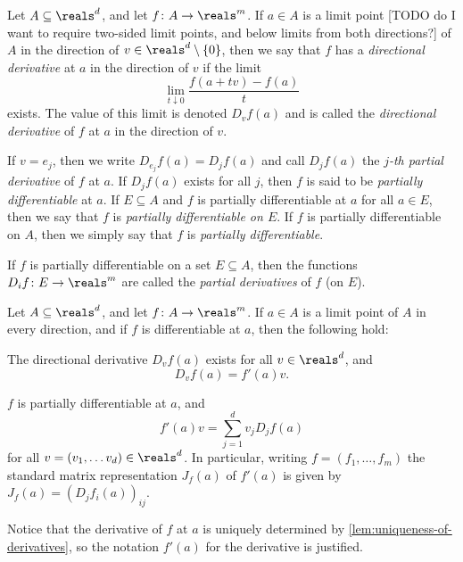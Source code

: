 \documentclass[article, a4paper, 11pt, oneside]{memoir}
\numberwithin{equation}{chapter}
\begin{document}
\begin{definition}
    Let $A \subseteq \reals^d$, and let $f \colon A \to \reals^m$. If $a \in A$ is a limit point [TODO do I want to require two-sided limit points, and below limits from both directions?] of $A$ in the direction of $v \in \reals^d \setminus \{0\}$, then we say that $f$ has a \emph{directional derivative} at $a$ in the direction of $v$ if the limit
    \begin{equation*}
        \lim_{t \downarrow 0} \frac{f(a + tv) - f(a)}{t}
    \end{equation*}
    exists. The value of this limit is denoted $D_v f(a)$ and is called the \emph{directional derivative} of $f$ at $a$ in the direction of $v$.

    If $v = e_j$, then we write $D_{e_j} f(a) = D_j f(a)$ and call $D_j f(a)$ the \emph{$j$-th partial derivative} of $f$ at $a$. If $D_j f(a)$ exists for all $j$, then $f$ is said to be \emph{partially differentiable} at $a$. If $E \subseteq A$ and $f$ is partially differentiable at $a$ for all $a \in E$, then we say that $f$ is \emph{partially differentiable on $E$}. If $f$ is partially differentiable on $A$, then we simply say that $f$ is \emph{partially differentiable}.

    If $f$ is partially differentiable on a set $E \subseteq A$, then the functions $D_i f \colon E \to \reals^m$ are called the \emph{partial derivatives} of $f$ (on $E$).
\end{definition}

\begin{proposition}
    Let $A \subseteq \reals^d$, and let $f \colon A \to \reals^m$. If $a \in A$ is a limit point of $A$ in every direction, and if $f$ is differentiable at $a$, then the following hold:
    \begin{enumprop}
        \item The directional derivative $D_v f(a)$ exists for all $v \in \reals^d$, and
        \begin{equation*}
            D_v f(a)
                = f'(a) v.
        \end{equation*}

        \item \label{enumprop:derivative-linear-combination-of-partials} $f$ is partially differentiable at $a$, and
        \begin{equation*}
            f'(a)v
                = \sum_{j=1}^d v_j D_j f(a)
        \end{equation*}
        for all $v = (v_1, \ldots v_d) \in \reals^d$. In particular, writing $f = (f_1, \ldots, f_m)$ the standard matrix representation $J_f(a)$ of $f'(a)$ is given by $J_f(a) = (D_j f_i(a))_{ij}$.
    \end{enumprop}
\end{proposition}
%
Notice that the derivative of $f$ at $a$ is uniquely determined by \cref{lem:uniqueness-of-derivatives}, so the notation $f'(a)$ for the derivative is justified.
\end{document}
